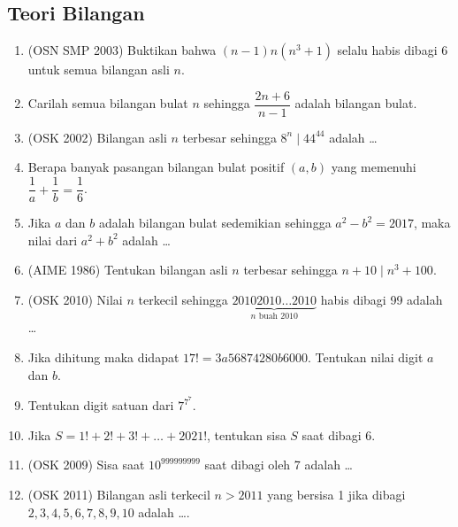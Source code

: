 \subsection{Teori Bilangan}
\begin{enumerate}
    \item (OSN SMP 2003) Buktikan bahwa $(n-1)n(n^3+1)$ selalu habis dibagi 6 untuk semua bilangan asli $n$.
    
    \item Carilah semua bilangan bulat $n$ sehingga $\dfrac{2n+6}{n-1}$ adalah bilangan bulat.
    
    \item (OSK 2002) Bilangan asli $n$ terbesar sehingga $8^n \mid 44^{44}$ adalah \dots
    
    \item Berapa banyak pasangan bilangan bulat positif $(a,b)$ yang memenuhi $\dfrac{1}{a}+\dfrac{1}{b}=\dfrac{1}{6}$.
    
    \item Jika $a$ dan $b$ adalah bilangan bulat sedemikian sehingga $a^2-b^2=2017$, maka nilai dari $a^2+b^2$ adalah \dots
    
    \item (AIME 1986) Tentukan bilangan asli $n$ terbesar sehingga $n+10 \mid n^3+100$.
    
    \item (OSK 2010) Nilai $n$ terkecil sehingga $\underbrace{20102010\dots2010}_\text{$n$ buah 2010}$ habis dibagi 99 adalah \dots
    
    \item Jika dihitung maka didapat $17! = 3a56874280b6000$. Tentukan nilai digit $a$ dan $b$.
    
    \item Tentukan digit satuan dari $7^{7^7}$.
    
    \item Jika $S=1!+2!+3!+\dots+2021!$, tentukan sisa $S$ saat dibagi 6.
    
    \item (OSK 2009) Sisa saat $10^{999999999}$ saat dibagi oleh 7 adalah \dots
    \item (OSK 2011) Bilangan asli terkecil $n>2011$ yang bersisa 1 jika dibagi $2,3,4,5,6,7,8,9,10$ adalah \dots.
\end{enumerate}

